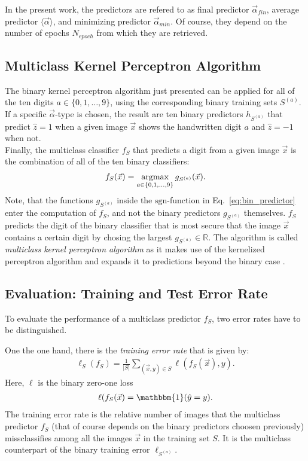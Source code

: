 In the present work, the predictors are refered to as final predictor $\vec{\alpha}_{fin}$, average predictor $\langle \vec{\alpha} \rangle$, and minimizing predictor $\vec{\alpha}_{min}$. Of course, they depend on the number of epochs $N_{epoch}$ from which they are retrieved.

\subsection{Multiclass Kernel Perceptron Algorithm}

The binary kernel perceptron algorithm just presented can be applied for all of the ten digits $a \in \{0, 1, \dots, 9\}$, using the corresponding binary training sets $S^{(a)}$. If a specific $\vec{\alpha}$-type is chosen, the result are ten binary predictors $h_{S^{(a)}}$ that predict $\hat{z} = 1$ when a given image $\vec{x}$ shows the handwritten digit $a$ and $\hat{z} = -1$ when not. \\

Finally, the multiclass classifier $f_S$ that predicts a digit from a given image $\vec{x}$ is the combination of all of the ten binary classifiers:
\begin{align*}
	f_S(\vec{x}) = \operatorname*{argmax}_{a \in \{0, 1, \dots, 9\}} g_{S^{(a)}}(\vec{x}).
\end{align*}
Note, that the functions $g_{S^{(a)}}$ inside the $\mathrm{sgn}$-function in Eq.~\ref{eq:bin_predictor} enter the computation of $f_S$, and not the binary predictors $g_{S^{(a)}}$ themselves.
$f_S$ predicts the digit of the binary classifier that is most secure that the image $\vec{x}$ contains a certain digit by chosing the largest $g_{S^{(a)}}\in\mathbb{R}$. The algorithm is called \textit{multiclass kernel perceptron algorithm} as it makes use of the kernelized perceptron algorithm and expands it to predictions beyond the binary case \cite{multiclass2005}. 

\subsection{Evaluation: Training and Test Error Rate}

To evaluate the performance of a multiclass predictor $f_S$, two error rates have to be distinguished. 

One the one hand, there is the \textit{training error rate} that is given by:
\begin{align}\label{eq:training_error}
	\ell_{S}(f_S) = \frac{1}{|S|} \sum_{(\vec{x}, y) \in S} \ell(f_S(\vec{x}), y).
\end{align}
Here, $\ell$ is the binary zero-one loss
\begin{align*}
	\ell(f_S(\vec{x}) = \mathbbm{1}(\hat{y} = y).
\end{align*}
The training error rate is the relative number of images that the multiclass predictor $f_S$ (that of course depends on the binary predictors choosen previously) missclassifies among all the images $\vec{x}$ in the training set $S$. It is the multiclass counterpart of the binary training error $\ell_{S^{(a)}}$.

